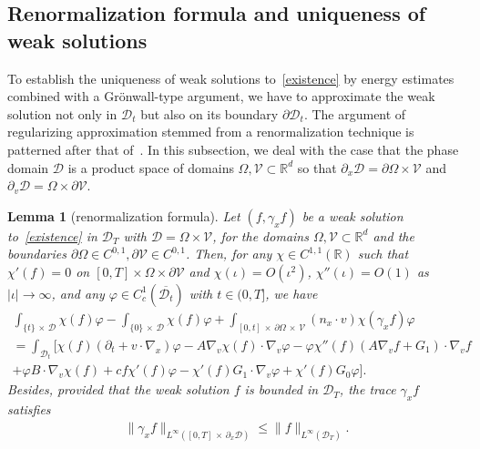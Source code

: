 \documentclass[10pt]{amsart}
\newtheorem{lemm}[theo]{Lemma}\newtheorem{prop}[theo]{Proposition}\newtheorem{coro}[theo]{Corollary}\newtheorem{conj}[theo]{Conjecture}
\theoremstyle{definition}\newtheorem{defi}[theo]{Definition}\newtheorem{rema}[theo]{Remark}\newtheorem{exam}[theo]{Example}\newtheorem{exem}[theo]{Example}\newtheorem{nota}[theo]{Notation}
\newcommand*\p{\partial}
\newcommand*\R {\mathbb{R}}
\newcommand*\V {\mathcal{V}}
\newcommand*\D {\mathcal{D}}
\begin{document}
\subsection{Renormalization formula and uniqueness of weak solutions}\label{RU}
To establish the uniqueness of weak solutions to~\eqref{existence} by energy estimates combined with a Gr\"onwall-type argument, we have to approximate the weak solution not only in $\D_t$ but also on its boundary $\p\D_t$. The argument of regularizing approximation stemmed from a renormalization technique is patterned after that of~\cite{Mischler3}. In this subsection, we deal with the case that the phase domain $\D$ is a product space of domains $\Omega,\V\subset\R^d$ so that $\p_x\D=\p\Omega\times\V$ and $\p_v\D=\Omega\times\p\V$.

\begin{lemm}[renormalization formula]\label{trace}
Let $(f,\gamma_xf)$ be a weak solution to~\eqref{existence} in $\D_T$ with $\D=\Omega\times\V$, for the domains $\Omega,\V\subset\R^d$ and the boundaries $\p\Omega\in C^{0,1},\p\V\in C^{0,1}$. Then, for any $\chi\in C^{1,1}(\R)$ such that $\chi'(f)=0$ on $[0,T]\times\Omega\times\p\V$ and $\chi(\iota)=O(\iota^2)$, $\chi''(\iota)=O(1)$ as $|\iota|\rightarrow\infty$, and any $\varphi\in C^1_c(\overline{\D_t})$ with $t\in(0,T]$, we have
\begin{multline}\label{ren}
\int_{\{t\}\,\times\,\D} \chi(f)\varphi -\int_{\{0\}\,\times\,\D}\chi(f)\varphi + \int_{[0,t]\,\times\,\p\Omega\,\times\,\V} (n_x\cdot v) \chi(\gamma_xf)\varphi\\
=\int_{\D_t} \big[\chi(f)(\p_t+v\cdot\nabla_x)\varphi -A\nabla_v\chi(f) \cdot\nabla_v\varphi - \varphi\chi''(f)(A\nabla_vf+G_1)\cdot\nabla_vf\\
+ \varphi B\cdot\nabla_v\chi(f) + c f\chi'(f)\varphi -\chi'(f) G_1\cdot\nabla_v\varphi + \chi'(f)G_0\varphi\big].
\end{multline}
Besides, provided that the weak solution $f$ is bounded in $\D_T$, the trace $\gamma_xf$ satisfies
\begin{align*}
\|\gamma_xf\|_{L^\infty([0,T]\,\times\,\p_x\D)}\le\|f\|_{L^\infty(\D_T)}.
\end{align*}
\end{lemm}
\end{document}
